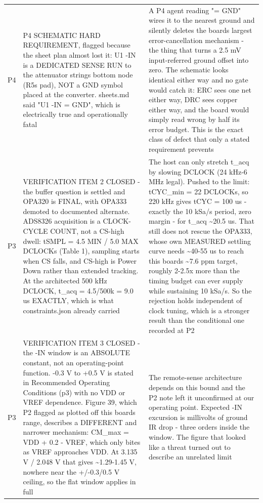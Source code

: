 \documentclass[11pt,a4paper]{article}
\begin{document}
{\begin{longtable}{lp{5.2cm}p{7.2cm}}
P4 & P4 SCHEMATIC HARD REQUIREMENT, flagged because the sheet plan almost lost it: U1 -IN is a DEDICATED SENSE RUN to the attenuator strings bottom node (R5s pad), NOT a GND symbol placed at the converter. sheets.md said "U1 -IN = GND", which is electrically true and operationally fatal & A P4 agent reading "= GND" wires it to the nearest ground and silently deletes the boards largest error-cancellation mechanism - the thing that turns a 2.5 mV input-referred ground offset into zero. The schematic looks identical either way and no gate would catch it: ERC sees one net either way, DRC sees copper either way, and the board would simply read wrong by half its error budget. This is the exact class of defect that only a stated requirement prevents \\
P3 & VERIFICATION ITEM 2 CLOSED - the buffer question is settled and OPA320 is FINAL, with OPA333 demoted to documented alternate. ADS8326 acquisition is a CLOCK-CYCLE COUNT, not a CS-high dwell: tSMPL = 4.5 MIN / 5.0 MAX DCLOCKs (Table 1), sampling starts when CS falls, and CS-high is Power Down rather than extended tracking. At the architected 500 kHz DCLOCK, t\_acq = 4.5/500k = 9.0 us EXACTLY, which is what constraints.json already carried & The host can only stretch t\_acq by slowing DCLOCK (24 kHz-6 MHz legal). Pushed to the limit: tCYC\_min = 22 DCLOCKs, so 220 kHz gives tCYC = 100 us - exactly the 10 kSa/s period, zero margin - for t\_acq \textasciitilde{}20.5 us. That still does not rescue the OPA333, whose own MEASURED settling curve needs \textasciitilde{}40-55 us to reach this boards \textasciitilde{}7.6 ppm target, roughly 2-2.5x more than the timing budget can ever supply while sustaining 10 kSa/s. So the rejection holds independent of clock tuning, which is a stronger result than the conditional one recorded at P2 \\
P3 & VERIFICATION ITEM 3 CLOSED - the -IN window is an ABSOLUTE constant, not an operating-point function. -0.3 V to +0.5 V is stated in Recommended Operating Conditions (p3) with no VDD or VREF dependence. Figure 39, which P2 flagged as plotted off this boards range, describes a DIFFERENT and narrower mechanism: CM\_max = VDD + 0.2 - VREF, which only bites as VREF approaches VDD. At 3.135 V / 2.048 V that gives \textasciitilde{}1.29-1.45 V, nowhere near the +/-0.3/0.5 V ceiling, so the flat window applies in full & The remote-sense architecture depends on this bound and the P2 note left it unconfirmed at our operating point. Expected -IN excursion is millivolts of ground IR drop - three orders inside the window. The figure that looked like a threat turned out to describe an unrelated limit \\

\end{longtable}}
\end{document}
